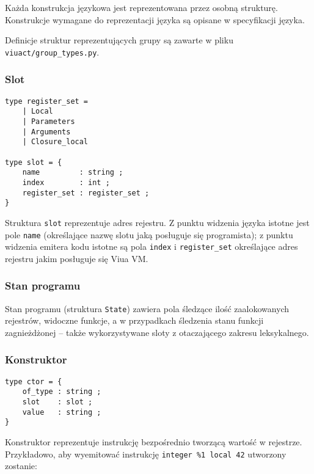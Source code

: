 Każda konstrukcja językowa jest reprezentowana przez osobną strukturę. Konstrukcje wymagane do reprezentacji
języka \ViuAct są opisane w specyfikacji języka.

Definicje struktur reprezentujących grupy są zawarte w pliku \texttt{viuact/group\_types.py}.

\subsubsection{Slot}
\label{diagram_klas_slot}

\begin{small}
\begin{lstlisting}
type register_set =
    | Local
    | Parameters
    | Arguments
    | Closure_local

type slot = {
    name         : string ;
    index        : int ;
    register_set : register_set ;
}
\end{lstlisting}
\end{small}

Struktura \texttt{slot} reprezentuje adres rejestru. Z punktu widzenia języka \ViuAct istotne jest pole
\texttt{name} (określające nazwę slotu jaką posługuje się programista); z punktu widzenia emitera kodu istotne
są pola \texttt{index} i \texttt{register\_set} określające adres rejestru jakim posługuje się Viua VM.

\subsubsection{Stan programu}
\label{diagram_klas_stan_programu}

Stan programu (struktura \texttt{State}) zawiera pola śledzące ilość zaalokowanych rejestrów, widoczne
funkcje, a w przypadkach śledzenia stanu funkcji zagnieżdżonej -- także wykorzystywane sloty z otaczającego
zakresu leksykalnego.

\subsubsection{Konstruktor}
\label{diagram_klas_konstruktor}

\begin{small}
\begin{lstlisting}
type ctor = {
    of_type : string ;
    slot    : slot ;
    value   : string ;
}
\end{lstlisting}
\end{small}

Konstruktor reprezentuje instrukcję bezpośrednio tworzącą wartość w rejestrze. Przykładowo, aby wyemitować
instrukcję \texttt{integer \%1 local 42} utworzony zostanie:

